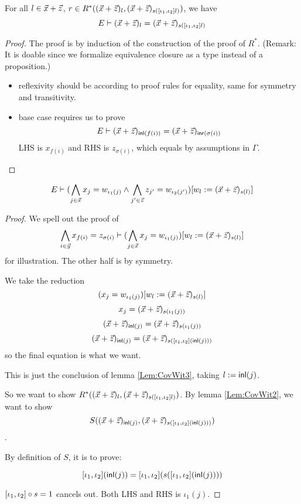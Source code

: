 \begin{lemma}\label{Lem:CovWit3}
  For all $l\in \vec{x}+\vec{z}$, $r\in R^*((\vec{x}+\vec{z})_l,(\vec{x}+\vec{z})_{s([\iota_1,\iota_2] l)})$, we have
  \begin{equation*}
    E \vdash (\vec{x}+\vec{z})_l = (\vec{x}+\vec{z})_{s([\iota_1,\iota_2] l)}
  \end{equation*}
\end{lemma}

\begin{proof}
  The proof is by induction of the construction of the proof of $R^*$. (Remark: It is doable since we formalize equivalence closure
  as a type instead of a proposition.)

\begin{itemize}
    \item reflexivity should be according to proof rules for equality, same for symmetry and transitivity.
    \item base case requires us to prove
    \[E\vdash (\vec{x}+\vec{z})_{\mathsf{inl}(f(i))} = (\vec{x}+\vec{z})_{\mathsf{inr}(\sigma(i))}\]
    LHS is $x_{f(i)}$ and RHS is $z_{\sigma(i)}$, which equals by assumptions in $\Gamma$.
\end{itemize}
\end{proof}

\begin{lemma}\label{Lem:CovWit4}
  \begin{equation*}
    E \vdash (\bigwedge_{j\in\vec{x}}x_j = w_{\iota_1(j)}\land \bigwedge_{j'\in\vec{z}}z_{j'}= w_{\iota_2(j')}) [w_l:=(\vec{x}+\vec{z})_{s(l)}]
  \end{equation*}
\end{lemma}
\begin{proof}
  We spell out the proof of
  \begin{equation*}
    \bigwedge_{i\in \vec{y}} x_{f(i)} = z_{\sigma(i)} \vdash
     (\bigwedge_{j\in\vec{x}}x_j = w_{\iota_1(j)}) [w_l:=(\vec{x}+\vec{z})_{s(l)}]
   \end{equation*}
   for illustration. The other half is by symmetry.

  We take the reduction
\[(x_j = w_{\iota_1(j)}) [w_l:=(\vec{x}+\vec{z})_{s(l)}]\]
\[x_j = (\vec{x}+\vec{z})_{s(\iota_1(j))}\]
\[(\vec{x}+\vec{z})_{\mathsf{inl}(j)} = (\vec{x}+\vec{z})_{s(\iota_1(j))}\]
\[(\vec{x}+\vec{z})_{\mathsf{inl}(j)} = (\vec{x}+\vec{z})_{s([\iota_1,\iota_2] (\mathsf{inl}(j)))}\]
so the final equation is what we want.

This is just the conclusion of lemma \ref{Lem:CovWit3}, taking $l := \mathsf{inl}(j)$.

So we want to show $R^*((\vec{x}+\vec{z})_l,(\vec{x}+\vec{z})_{s([\iota_1,\iota_2] l)})$. By lemma \ref{Lem:CovWit2}, we want to show \[S((\vec{x}+\vec{z})_{\mathsf{inl}(j)},(\vec{x}+\vec{z})_{s([\iota_1,\iota_2] (\mathsf{inl}(j)))})\].

By definition of $S$, it is to prove:

\[[\iota_1,\iota_2] (\mathsf{inl}(j)) = [\iota_1,\iota_2] (s([\iota_1,\iota_2] (\mathsf{inl}(j)))) \]

$[\iota_1,\iota_2]\circ s = 1$ cancels out. Both LHS and RHS is $\iota_1(j)$.

\end{proof}




